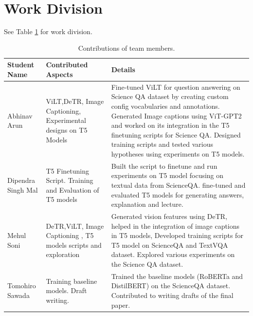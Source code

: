 \documentclass[10pt,twocolumn,letterpaper]{article}
\begin{document}
\section{Work Division}
See Table \ref{tab:contributions} for work division. 
\newpage

{\small


}

\begin{table}[b]
\begin{center}
\begin{tabular}{|l|p{12em}|p{10cm}|}
\hline
Student Name & Contributed Aspects & Details \\
\hline\hline
Abhinav Arun & ViLT,DeTR, Image Captioning, Experimental designs on T5 Models & Fine-tuned ViLT for question answering on Science QA dataset by creating custom config vocabularies and annotations. Generated Image captions using ViT-GPT2 and worked on its integration in the T5 finetuning scripts for Science QA. Designed training scripts and tested various hypotheses using experiments on T5 models. \\ 
Dipendra Singh Mal & T5 Finetuning Script. Training and Evaluation of T5 models & Built the script to finetune and run experiments on T5 model focusing on textual data from ScienceQA. fine-tuned and evaluated T5 models for generating answers, explanation and lecture.\\
Mehul Soni & DeTR,ViLT, Image Captioning , T5 models scripts and exploration & Generated vision features using DeTR, helped in the integration of image captions in T5 models, Developed training scripts for T5 model on ScienceQA and TextVQA dataset. Explored various experiments on the Science QA dataset. \\ 
Tomohiro Sawada & Training baseline models. Draft writing. & Trained the baseline models (RoBERTa and DistilBERT) on the ScienceQA dataset. Contributed to writing drafts of the final paper.\\
\hline
\end{tabular}
\end{center}
\caption{Contributions of team members.}
\label{tab:contributions}
\end{table}
\end{document}
